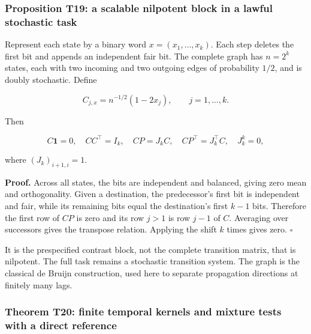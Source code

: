 \documentclass[11pt,a4paper]{article}
\begin{document}
\subsubsection{Proposition T19: a scalable nilpotent block in a lawful
stochastic
task}\label{proposition-t19-a-scalable-nilpotent-block-in-a-lawful-stochastic-task}

\par
\noindent\begin{minipage}{\linewidth}

Represent each state by a binary word \(x=(x_1,\ldots,x_k)\). Each step
deletes the first bit and appends an independent fair bit. The complete
graph has \(n=2^k\) states, each with two incoming and two outgoing
edges of probability \(1/2\), and is doubly stochastic. Define

\[
C_{j,x}=n^{-1/2}(1-2x_j),\qquad j=1,\ldots,k.
\]

\end{minipage}\par

\par
\noindent\begin{minipage}{\linewidth}

Then

\[
C\mathbf1=0,\quad CC^\top=I_k,\quad
CP=J_kC,\quad CP^\top=J_k^\top C,\quad J_k^k=0,
\]

\end{minipage}\par

where \((J_k)_{i+1,i}=1\).

\textbf{Proof.} Across all states, the bits are independent and
balanced, giving zero mean and orthogonality. Given a destination, the
predecessor's first bit is independent and fair, while its remaining
bits equal the destination's first \(k-1\) bits. Therefore the first row
of \(CP\) is zero and its row \(j>1\) is row \(j-1\) of \(C\). Averaging
over successors gives the transpose relation. Applying the shift \(k\)
times gives zero. \(\square\)

It is the prespecified contrast block, not the complete transition
matrix, that is nilpotent. The full task remains a stochastic transition
system. The graph is the classical de Bruijn construction, used here to
separate propagation directions at finitely many lags.

\subsubsection{Theorem T20: finite temporal kernels and mixture tests
with a direct
reference}\label{theorem-t20-finite-temporal-kernels-and-mixture-tests-with-a-direct-reference}
\end{document}
